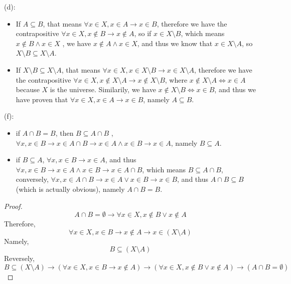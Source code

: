 \documentclass[a4paper, justified]{tufte-handout}
\begin{document}
\begin{solution}
  (d):
  \begin{itemize}
    \item If $A \subseteq B$, that means $\forall x \in X, x \in A \rightarrow x \in B$, therefore we have the contrapositive $\forall x \in X, x \notin B \rightarrow x \notin A$, so if $x \in X\setminus B$, which means $x\notin B \wedge x\in X$ , we have $x \notin A \wedge x \in X$, and thus we know that $x\in X\setminus A$, so  $X\setminus B \subseteq X\setminus A$.
    \item If $X\setminus B \subseteq X\setminus A$, that means  $\forall x \in X, x \in X\setminus B \rightarrow x\in X\setminus A$, therefore we have the contrapositive $\forall x \in X, x \notin X\setminus A \rightarrow x\notin X\setminus B$, where $x \notin X\setminus A \Leftrightarrow x \in A$ because $X$ is the universe. Similarily, we have $x \notin X\setminus B \Leftrightarrow x \in B$, and thus we have proven that $\forall x \in X, x \in A \rightarrow x \in B$, namely $A \subseteq B$.
  \end{itemize}
  (f):
  \begin{itemize}
    \item if $A\cap B = B$, then $B\subseteq A\cap B$ , $\forall x, x \in B \rightarrow x \in A \cap B \rightarrow x \in A \wedge x \in B \rightarrow x \in A$, namely $B \subseteq A$.
    \item if $B \subseteq A$, $\forall x, x \in B \rightarrow x \in A$, and thus $\forall x, x \in B \rightarrow x \in A \wedge x\in B \rightarrow x\in A \cap B$, which means $B\subseteq A\cap B$, conversely, $\forall x, x \in A \cap B \rightarrow x \in A \vee x \in B \rightarrow x \in B$, and thus $A \cap B \subseteq B$ (which is actually obvious), namely $A\cap B = B$.
  \end{itemize}
\end{solution}

\begin{problem}[UD Problem 7.2]
\end{problem}

\begin{proof}
  $$ A \cap B = \emptyset \rightarrow \forall x \in X, x \notin B \vee x \notin A $$ 
  Therefore,
  $$ \forall x \in X, x \in B \rightarrow x \notin A \rightarrow x \in (X \setminus A) $$
  Namely,
  $$ B \subseteq (X \setminus A) $$
  Reversely,
  $$ B \subseteq (X \setminus A) \rightarrow (\forall x \in X, x \in B \rightarrow x \notin A) \rightarrow (\forall x \in X, x \notin B \vee x \notin A) \rightarrow (A \cap B = \emptyset) $$
\end{proof}
\end{document}
